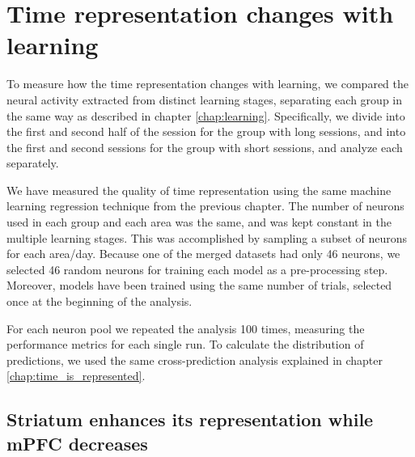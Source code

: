

\chapter{Time representation changes with learning}
\label{chap:rep_changes}

To measure how the time representation changes with learning, we compared the neural activity extracted from distinct learning stages, separating each group in the same way as described in chapter \ref{chap:learning}. Specifically, we divide into the first and second half of the session for the group with long sessions, and into the first and second sessions for the group with short sessions, and analyze each separately. 

We have measured the quality of time representation using the same machine learning regression technique from the previous chapter. The number of neurons used in each group and each area was the same, and was kept constant in the multiple learning stages. This was accomplished by sampling a subset of neurons for each area/day. Because one of the merged datasets had only 46 neurons, we selected 46 random neurons for training each model as a pre-processing step. Moreover, models have been trained using the same number of trials, selected once at the beginning of the analysis.

For each neuron pool we repeated the analysis 100 times, measuring the performance metrics for each single run. To calculate the distribution of predictions, we used the same cross-prediction analysis explained in chapter \ref{chap:time_is_represented}. 

\section{Striatum enhances its representation while mPFC decreases}

